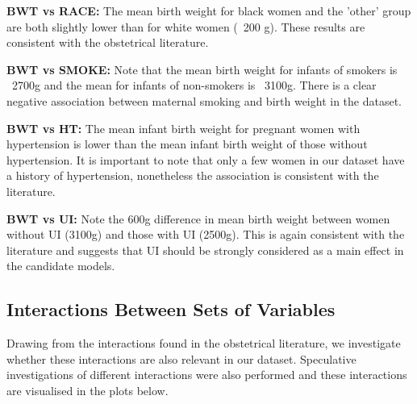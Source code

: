 \textbf{BWT vs RACE:} The mean birth weight for black women and the 'other' group are both slightly lower than for white women (~200 g). These results are consistent with the obstetrical literature.

\textbf{BWT vs SMOKE:} Note that the mean birth weight for infants of smokers is ~2700g and the mean for infants of non-smokers is ~3100g. There is a clear negative association between maternal smoking and birth weight in the dataset.

\textbf{BWT vs HT:} The mean infant birth weight for pregnant women with hypertension is lower than the mean infant birth weight of those without hypertension. It is important to note that only a few women in our dataset have a history of hypertension, nonetheless the association is consistent with the literature.\cite{HT-LBW}\cite{InducedHT}\cite{HTRace}

\textbf{BWT vs UI:} Note the 600g difference in mean birth weight between women without UI (3100g) and those with UI (2500g). This is again consistent with the literature and suggests that UI should be strongly considered as a main effect in the candidate models.

\subsection{Interactions Between Sets of Variables} \label{ExploratoryInteractions}
Drawing from the interactions found in the obstetrical literature, we investigate whether these interactions are also relevant in our dataset. Speculative investigations of different interactions were also performed and these interactions are visualised in the plots below.

